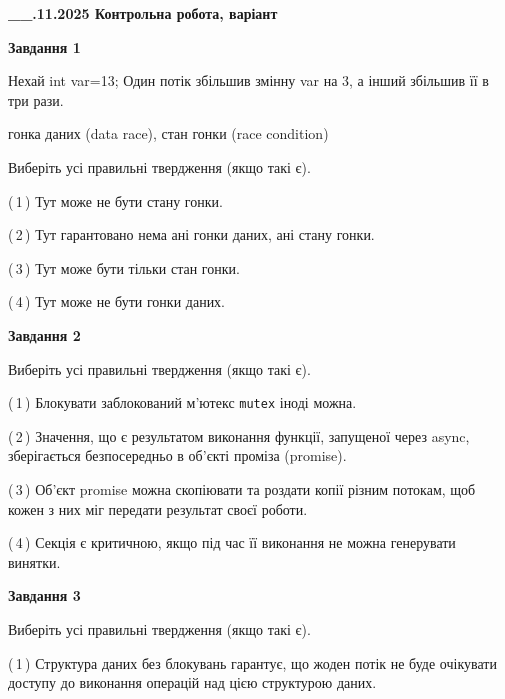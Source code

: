 \documentclass[12pt, ukrainian]{article}
\def\code#1{\Verb!#1!}
\begin{document}
\begin {large}

\textbf{\_\_.11.2025 Контрольна робота, варіант  }\par


{

\begin{center}
\textbf{Завдання 1}
\end{center}
Нехай int var=13; Один потік збільшив змінну var на 3, а інший збільшив її в три рази.

гонка даних (data race), стан гонки (race condition)

Виберіть усі правильні твердження (якщо такі є).\par
\vspace{2mm}
(\,1\,) Тут може не бути стану гонки.%

(\,2\,) Тут гарантовано нема ані гонки даних, ані стану гонки.%

(\,3\,) Тут може бути тільки стан гонки.%

(\,4\,) Тут може не бути гонки даних.%



\begin{center}
\textbf{Завдання 2}
\end{center}
Виберіть усі правильні твердження (якщо такі є).\par
\vspace{2mm}

(\,1\,) Блокувати заблокований м’ютекс  \code{mutex} іноді можна.%

(\,2\,) Значення, що є результатом виконання функції, запущеної через async, зберігається безпосередньо в об’єкті проміза (promise).%

(\,3\,) Об’єкт promise можна скопіювати та роздати копії різним потокам, щоб кожен з них міг передати результат своєї роботи.%

(\,4\,) Секція є критичною, якщо під час її виконання не можна генерувати винятки.%



\begin{center}
\textbf{Завдання 3}
\end{center}
Виберіть усі правильні твердження (якщо такі є).\par
\vspace{2mm}

(\,1\,) Структура даних без блокувань гарантує, що жоден потік не буде очікувати доступу до виконання операцій над цією структурою даних.%

}
\end{large}
\end{document}
